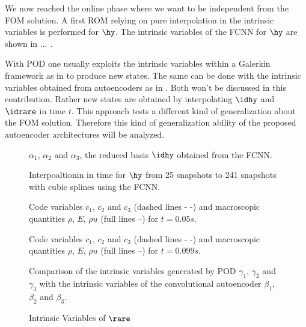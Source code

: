 We now reached the online phase where we want to be independent from the FOM solution. A first ROM relying on pure interpolation in the intrinsic variables is performed for \(\hy\). The intrinsic variables of the FCNN for \(\hy\) are shown in ... . 

With POD one usually exploits the intrinsic variables within a Galerkin framework as in \cite{Bernard} to produce new states. The same can be done with the intrinsic variables obtained from autoencoders as in \cite{Carlberg}. Both won't be discussed in this contribution. Rather new states are obtained by interpolating \(\idhy\) and \(\idrare\) in time \(t\). This approach tests a different kind of generalization about the FOM solution. Therefore this kind of generalization ability of the proposed autoencoder architectures will be analyzed.

\begin{figure}[H]
	
	\caption{\(\alpha_1\), \(\alpha_2\) and \(\alpha_3\), the reduced basis \(\idhy\) obtained from the FCNN.}
\end{figure}
\begin{figure}[H]
	
	\caption{Interpoaltionin in time for \(\hy\) from 25 snapshots to 241 snapshots with cubic splines using the FCNN.}
\end{figure}
\begin{figure}[H]
	\scalebox{1}{}
	\caption{Code variables \(c_1\), \(c_2\) and \(c_3\) (dashed lines - -) and macroscopic quantities \(\rho\), \(E\), \(\rho u\) (full lines --) for \(t=0.05s\).}
\end{figure}
\begin{figure}[H]
	\scalebox{1}{}
	\caption{Code variables \(c_1\), \(c_2\) and \(c_3\) (dashed lines - -) and macroscopic quantities \(\rho\), \(E\), \(\rho u\) (full lines --) for \(t=0.099s\).}
\end{figure}
\begin{figure}[H]
	\scalebox{.6}{}
	\caption{Comparison of the intrinsic variables generated by POD \(\gamma_1\), \(\gamma_2\) and \(\gamma_3\) with the intrinsic variables of the convolutional autoencoder \(\beta_1\), \(\beta_2\) and \(\beta_3\).}
\end{figure}
\begin{figure}[H]
	\scalebox{0.9}{}
	\caption{Intrinsic Variables of $\rare$}
\end{figure}
